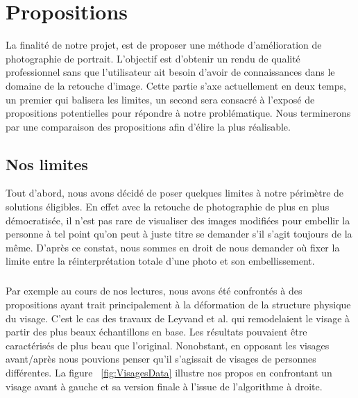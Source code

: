 \documentclass[11pt, french,screen]{report-rd-info}
\begin{document}
\chapter{Propositions}
\label{chap:Propositions}
La finalité de notre projet, est de proposer une méthode d'amélioration de photographie de portrait. L’objectif est d’obtenir un rendu de qualité professionnel sans que l’utilisateur ait besoin d’avoir de connaissances dans le domaine de la retouche d’image.
Cette partie s’axe actuellement en deux temps, un premier qui balisera les limites, un second sera consacré à l’exposé de propositions potentielles pour répondre à notre problématique. Nous terminerons par une comparaison des propositions afin d’élire la plus réalisable.
\section{Nos limites}
Tout d’abord, nous avons décidé de poser quelques limites à notre périmètre de solutions éligibles. En effet avec la retouche de photographie de plus en plus démocratisée, il n’est pas rare de visualiser des images modifiées pour embellir la personne à tel point qu’on peut à juste titre se demander s’il s’agit toujours de la même. D’après ce constat, nous sommes en droit de nous demander où fixer la limite entre la réinterprétation totale d’une photo et son embellissement.
\paragraph*{}
Par exemple au cours de nos lectures, nous avons été confrontés à des propositions ayant trait principalement à la déformation de la structure physique du visage. C'est le cas des travaux de Leyvand et al.\cite{Leyvand2008} qui remodelaient le visage à partir des plus beaux échantillons en base. Les résultats pouvaient être caractérisés de plus beau que l’original. Nonobstant, en opposant les visages avant/après nous pouvions penser qu’il s'agissait de visages de personnes différentes. La figure ~\ref{fig:VisagesData} illustre nos propos en confrontant un visage avant à gauche et sa version finale à l’issue de l’algorithme à droite.
\end{document}
